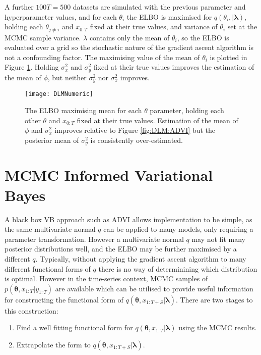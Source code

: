 \documentclass[12pt,a4paper]{article}%
\numberwithin{equation}{section}
\begin{document}
A further $100 T = 500$ datasets are simulated with the previous parameter and hyperparameter values, and for each $\theta_i$ the ELBO is maximised for $q(\theta_i, | \boldsymbol{\lambda})$, holding each $\theta_{j \neq i}$ and $x_{0:T}$ fixed at their true values, and variance of $\theta_i$ set at the MCMC sample variance. $\lambda$ contains only the mean of $\theta_i$, so the ELBO is evaluated over a grid so the stochastic nature of the gradient ascent algorithm is not a confounding factor. The maximising value of the mean of $\theta_i$ is plotted in Figure \ref{fig:DLM:Numeric}. Holding $\sigma^2_x$ and $\sigma^2_y$ fixed at their true values improves the estimation of the mean of $\phi$, but neither $\sigma^2_y$ nor $\sigma^2_x$ improves. 

\begin{figure}[h]
\centering
\texttt{[image: DLMNumeric]}
\caption{The ELBO maximising mean for each $\theta$ parameter, holding each other $\theta$ and $x_{0:T}$ fixed at their true values. Estimation of the mean of $\phi$ and $\sigma^2_x$ improves relative to Figure \ref{fig:DLM:ADVI} but the posterior mean of $\sigma^2_y$ is consistently over-estimated.}
\label{fig:DLM:Numeric}
\end{figure}

\section{MCMC Informed Variational Bayes}
\label{MIVB}

A black box VB approach such as ADVI allows implementation to be simple, as the same multivariate normal $q$ can be applied to many models, only requiring a parameter transformation. However a multivariate normal $q$ may not fit many posterior distributions well, and the ELBO may be further maximised by a different $q$. Typically, without applying the gradient ascent algorithm to many different functional forms of $q$ there is no way of determinining which distribution is optimal. However in the time-series context, MCMC samples of $p(\boldsymbol{\theta}, x_{1:T} | y_{1:T})$ are available which can be utilised to provide useful information for constructing the functional form of $q(\boldsymbol{\theta}, x_{1:T+S} | \boldsymbol{\lambda})$. There are two stages to this construction:
\begin{enumerate}
\item Find a well fitting functional form for $q(\boldsymbol{\theta}, x_{1:T} | \boldsymbol{\lambda})$ using the MCMC results.
\item Extrapolate the form to $q(\boldsymbol{\theta}, x_{1:T+S} | \boldsymbol{\lambda})$.
\end{enumerate}
\end{document}

